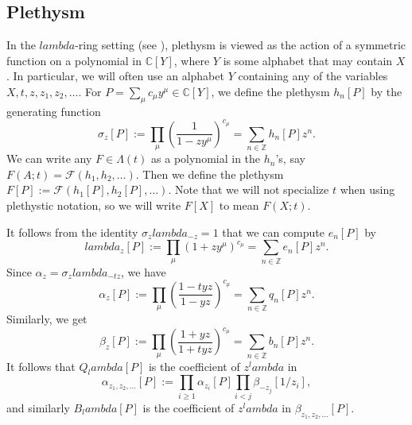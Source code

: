 \documentclass[12pt]{amsart}%
\def\lambda{lambda}%
\theoremstyle{remark}
\theoremstyle{definition}
\newcommand{\C}{\mathbb{C}}
\newcommand{\Z}{\mathbb{Z}}
\begin{document}
    \subsection{Plethysm}\label{section: plethysm definitions}

    In the $\lambda$-ring setting (see \cite{lascoux:2003}), plethysm is viewed as the action of a symmetric function on a polynomial in $\C[Y]$, where $Y$ is some alphabet that may contain $X$. In particular, we will often use an alphabet $Y$ containing any of the variables $X,t,z,z_1,z_2,\ldots$. For $P=\sum_\mu c_\mu y^\mu\in\C[Y]$, we define the plethysm $h_n[P]$ by the generating function
    \begin{equation*}
        \sigma_z[P]:=\prod_{\mu}\left(\frac{1}{1-zy^\mu}\right)^{c_\mu}=\sum_{n\in\Z}h_n[P]z^n.
    \end{equation*}
    We can write any $F\in\Lambda(t)$ as a polynomial in the $h_n$'s, say $F(A;t)=\mathcal{F}(h_1,h_2,\ldots)$. Then we define the plethysm $F[P]:=\mathcal{F}(h_1[P],h_2[P],\ldots)$. Note that we will not specialize $t$ when using plethystic notation, so we will write $F[X]$ to mean $F(X;t)$. 

    It follows from the identity $\sigma_z\lambda_{-z}=1$ that we can compute $e_n[P]$ by 
    \begin{equation*}
        \lambda_z[P]:=\prod_{\mu}(1+zy^\mu)^{c_\mu}=\sum_{n\in\Z}e_n[P]z^n.
    \end{equation*}
    Since $\alpha_z=\sigma_z\lambda_{-tz}$, we have
    \begin{equation}
        \alpha_z[P]:=\prod_{\mu}\left(\frac{1-tyz}{1-yz}\right)^{c_\mu}=\sum_{n\in\Z}q_n[P]z^n.
    \end{equation}
    Similarly, we get
    \begin{equation}
        \beta_z[P]:=\prod_{\mu}\left(\frac{1+yz}{1+tyz}\right)^{c_\mu}=\sum_{n\in\Z}b_n[P]z^n.
    \end{equation}
    It follows that $Q_\lambda[P]$ is the coefficient of $z^\lambda$ in
    \begin{equation*}
        \alpha_{z_1,z_2,\ldots}[P]:=\prod_{i\geq1}\alpha_{z_i}[P]\prod_{i<j}\beta_{-z_j}[1/z_i],
    \end{equation*}
    and similarly $B_\lambda[P]$ is the coefficient of $z^\lambda$ in $\beta_{z_1,z_2,\ldots}[P]$.
    
\end{document}
